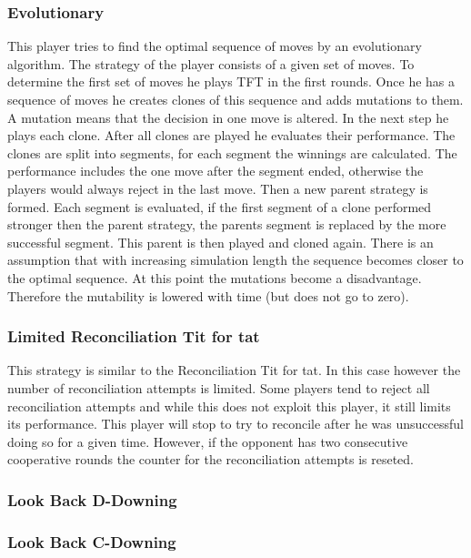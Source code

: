 \documentclass[11pt,twoside]{article}
\begin{document}
\subsubsection{Evolutionary}
This player tries to find the optimal sequence of moves by an evolutionary algorithm. The strategy of the player consists of a given set of moves. To determine the first set of moves he plays TFT in the first rounds.
Once he has a sequence of moves he creates clones of this sequence and adds mutations to them. A mutation means that the decision in one move is altered.
In the next step he plays each clone. After all clones are played he evaluates their performance.
The clones are split into segments, for each segment the winnings are calculated. The performance includes the one move after the segment ended, otherwise the players would always reject in the last move.
Then a new parent strategy is formed. Each segment is evaluated, if the first segment of a clone performed stronger then the parent strategy, the parents segment is replaced by the more successful segment.
This parent is then played and cloned again.
There is an assumption that with increasing simulation length the sequence becomes closer to the optimal sequence. At this point the mutations become a disadvantage. Therefore the mutability is lowered with time (but does not go to zero).

\subsubsection{Limited Reconciliation Tit for tat}
This strategy is similar to the Reconciliation Tit for tat. In this case however the number of reconciliation attempts is limited. Some players tend to reject all reconciliation attempts and while this does not exploit this player, it still limits its performance. This player will stop to try to reconcile after he was unsuccessful doing so for a given time. However, if the opponent has two consecutive cooperative rounds the counter for the reconciliation attempts is reseted. 

\subsubsection{Look Back D-Downing}

\subsubsection{Look Back C-Downing}
\end{document}
